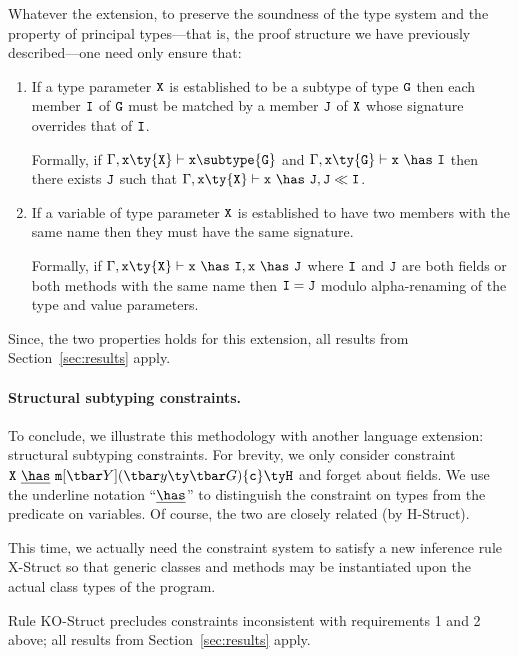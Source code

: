 Whatever the extension, to preserve the soundness of the type system and the property of principal types---that is, the proof structure we have previously described---one need only ensure that:
\begin{enumerate}
\item If a type parameter $\tt X$ is established to be a subtype of type $\tt G$ then each member $\tt I$ of $\tt G$ must be matched by a member $\tt J$ of $\tt X$ whose signature overrides that of $\tt I$.

Formally, if $\Gamma,{\tt x}\ty{\tt X}\vdash{\tt x}\subtype{\tt G}$ and $\Gamma,{\tt x}\ty{\tt G}\vdash{\tt x}~\has~{\tt I}$ then there exists $\tt J$ such that $\Gamma,{\tt x}\ty{\tt X}\vdash{\tt x}~\has~{\tt J}, {\tt J} \ll {\tt I}$.

\item If a variable of type parameter $\tt X$ is established to have two members with the same name then they must have the same signature.

Formally, if $\Gamma,{\tt x}\ty{\tt X}\vdash{\tt x}~\has~{\tt I},{\tt x}~\has~{\tt J}$ where $\tt I$ and $\tt J$ are both fields or both methods with the same name then ${\tt I}={\tt J}$ modulo alpha-renaming of the type and value parameters.
\end{enumerate}

Since, the two properties holds for this extension, all results from Section~\ref{sec:results} apply.


\paragraph{Structural subtyping constraints.}
To conclude, we illustrate this methodology with another language extension: structural subtyping constraints. For brevity, we only consider constraint ${\tt X}~\underline{\has}~\msign{Y}{y}{G}{c}{H}$ and forget about fields. We use the underline notation ``$\underline{\has}$'' to distinguish the constraint on types from the predicate on variables. Of course, the two are closely related (by {\sc H-Struct}).

This time, we actually need the constraint system to satisfy a new inference rule {\sc X-Struct} so that generic classes and methods may be instantiated upon the actual class types of the program.

Rule {\sc KO-Struct} precludes constraints inconsistent with requirements 1 and 2 above; all results from Section~\ref{sec:results} apply.

